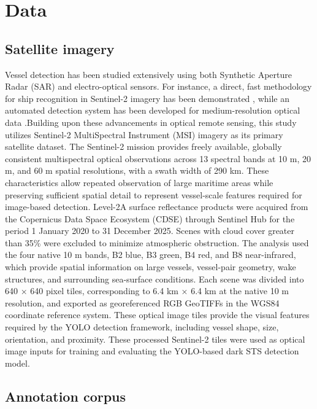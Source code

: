 \documentclass[10pt, letterpaper, twocolumn]{article}
\begin{document}
\section{Data}
\label{sec:data}

\subsection{Satellite imagery}
\label{sec:data-satellite}

Vessel detection has been studied extensively using both Synthetic Aperture Radar (SAR) and electro-optical sensors. For instance, a direct, fast methodology for ship recognition in Sentinel-2 imagery has been demonstrated \autocite{heiselberg2016}, while an automated detection system has been developed for medium-resolution optical data \autocite{stepec2019}.Building upon these advancements in optical remote sensing, this study utilizes Sentinel-2 MultiSpectral Instrument (MSI) imagery as its primary satellite dataset. The Sentinel-2 mission provides freely available, globally consistent multispectral optical observations across 13 spectral bands at 10 m, 20 m, and 60 m spatial resolutions, with a swath width of  290 km. These characteristics allow repeated observation of large maritime areas while preserving sufficient spatial detail to represent vessel-scale features required for image-based detection. Level-2A surface reflectance products were acquired from the Copernicus Data Space Ecosystem (CDSE) through Sentinel Hub for the period 1 January 2020 to 31 December 2025. Scenes with cloud cover greater than 35\% were excluded to minimize atmospheric obstruction. The analysis used the four native 10 m bands, B2 blue, B3 green, B4 red, and B8 near-infrared, which provide spatial information on large vessels, vessel-pair geometry, wake structures, and surrounding sea-surface conditions. Each scene was divided into 640 × 640 pixel tiles, corresponding to 6.4 km × 6.4 km at the native 10 m resolution, and exported as georeferenced RGB GeoTIFFs in the WGS84 coordinate reference system. These optical image tiles provide the visual features required by the YOLO detection framework, including vessel shape, size, orientation, and proximity. These processed Sentinel-2 tiles were used as optical image inputs for training and evaluating the YOLO-based dark STS detection model.


\subsection{Annotation corpus}
\label{sec:data-annotation}
\end{document}
